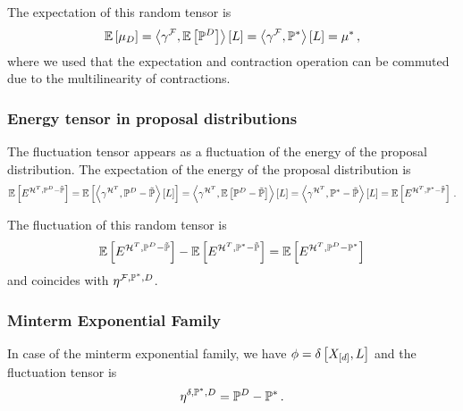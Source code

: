 The expectation of this random tensor is
\begin{align*}
    \mathbb{E}\left[\mu_{D}\right]
    =  \left\langle \gamma^{\mathcal{F}},\mathbb{E}\left[\mathbb{P}^{D}\right]\right\rangle \left[ L \right]
    =  \left\langle \gamma^{\mathcal{F}},\mathbb{P}^*\right\rangle \left[ L \right]
    =  \mu^* \, ,
\end{align*}
where we used that the expectation and contraction operation can be commuted due to the multilinearity of contractions.

\subsubsection{Energy tensor in proposal distributions}

The fluctuation tensor appears as a fluctuation of the energy of the proposal distribution.
The expectation of the energy of the proposal distribution is
\begin{align*}
    \mathbb{E}\left[E^{\mathcal{H}^T,\mathbb{P}^{D}-\tilde{\mathbb{P}}}\right]
    = \mathbb{E}\left[\left\langle \gamma^{\mathcal{H}^T},\mathbb{P}^{D}-\tilde{\mathbb{P}}\right\rangle \left[ L \right]\right]
    = \left\langle \gamma^{\mathcal{H}^T},\mathbb{E}\left[\mathbb{P}^{D}-\tilde{\mathbb{P}}\right]\right\rangle \left[ L \right]
    = \left\langle \gamma^{\mathcal{H}^T},\mathbb{P}^*-\tilde{\mathbb{P}}\right\rangle \left[ L \right]
    = \mathbb{E}\left[E^{\mathcal{H}^T,\mathbb{P}^*-\tilde{\mathbb{P}}}\right] \, .
\end{align*}

The fluctuation of this random tensor is
\begin{align*}
    \mathbb{E}\left[E^{\mathcal{H}^T,\mathbb{P}^{D}-\tilde{\mathbb{P}}}\right]  - \mathbb{E}\left[E^{\mathcal{H}^T,\mathbb{P}^*-\tilde{\mathbb{P}}}\right]
    = \mathbb{E}\left[E^{\mathcal{H}^T,\mathbb{P}^{D}-\mathbb{P}^*}\right]
\end{align*}
and coincides with $\eta^{\mathcal{F},\mathbb{P}^*,D}$.

\subsubsection{Minterm Exponential Family} %

In case of the minterm exponential family, we have $\phi=\delta\left[X_{[d]},L\right]$ and the fluctuation tensor is
\[ \eta^{\delta,\mathbb{P}^*,D} = \mathbb{P}^{D} - \mathbb{P}^* \, .  \]

